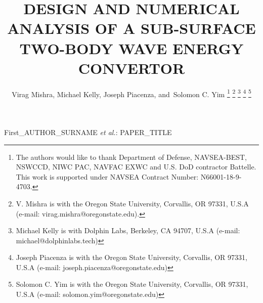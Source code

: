\documentclass[10pt,journal,a4paper,twoside]{./IMEJ}
\begin{document}
{}
%
\newcommand{\IMEJpaperid}{22}
\newcommand{\IMEJpapername}{PAPER-NAME}
\renewcommand{\thepage}{\IMEJpaperid-\arabic{page}}
\makeatletter
\def\@IMEJheaderstyle{\normalfont\scriptsize\color{gray}}
\makeatother
%
\newcommand{\figref}[1]{Fig.\ref{#1}}
\newcommand{\tabref}[1]{Table~\ref{#1}}
\newcommand{\secref}[1]{Section~\ref{#1}}
\newcommand{\IMEJconferenceheader}{%
  \shortstack[l]{%
    \scriptsize\bfseries ICOE OEE 2026 - INTERNATIONAL CONFERENCE ON OCEAN ENERGY \& OCEAN ENERGY EUROPE\\
    \scriptsize\bfseries 5--7 OCTOBER 2026, THE HAGUE}}
\makeatletter
\def\ps@IMEJtitlepagestyle{%
  \def\@oddhead{\hbox{}\normalfont\scriptsize\color{gray}\IMEJconferenceheader\hfil\thepage}%
  \def\@evenhead{\normalfont\scriptsize\color{gray}\thepage\hfil\IMEJconferenceheader\hbox{}}%
  \let\@oddfoot\@empty
  \let\@evenfoot\@empty}
\makeatother
\title{DESIGN AND NUMERICAL ANALYSIS OF A SUB-SURFACE TWO-BODY WAVE ENERGY CONVERTOR
}

\author{Virag Mishra,
        Michael Kelly,
        Joseph Piacenza,
        and~Solomon C. Yim%
\thanks{The authors would like to thank Department of Defense, NAVSEA-BEST, NSWCCD, NIWC PAC, NAVFAC EXWC and U.S. DoD contractor Battelle. This work is supported under NAVSEA Contract Number: N66001-18-9-4703.}%
\thanks{V. Mishra is with the Oregon State University, Corvallis, OR 97331, U.S.A (e-mail: virag.mishra@oregonstate.edu).}%
\thanks{Michael Kelly is with Dolphin Labs, Berkeley, CA 94707, U.S.A (e-mail: michael@dolphinlabs.tech)}%
\thanks{Joseph Piacenza is with the Oregon State University, Corvallis, OR 97331, U.S.A (e-mail: joseph.piacenza@oregonstate.edu)}%
\thanks{Solomon C. Yim is with the Oregon State University, Corvallis, OR 97331, U.S.A (e-mail: solomon.yim@oregonstate.edu)}
} %

%
{First\_AUTHOR\_SURNAME \MakeLowercase{\textit{et al.}}: PAPER\_TITLE}
\maketitle
\end{document}
